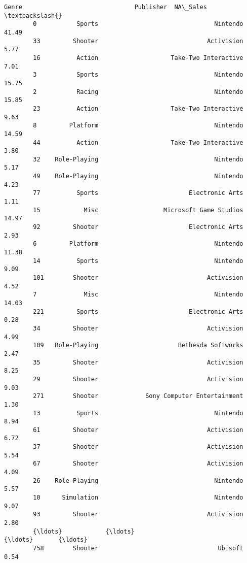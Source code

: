 \documentclass[11pt]{article}
\begin{document}
\begin{Verbatim}[commandchars=\\\{\}]
                     Genre                               Publisher  NA\_Sales  \textbackslash{}
        0           Sports                                Nintendo     41.49   
        33         Shooter                              Activision      5.77   
        16          Action                    Take-Two Interactive      7.01   
        3           Sports                                Nintendo     15.75   
        2           Racing                                Nintendo     15.85   
        23          Action                    Take-Two Interactive      9.63   
        8         Platform                                Nintendo     14.59   
        44          Action                    Take-Two Interactive      3.80   
        32    Role-Playing                                Nintendo      5.17   
        49    Role-Playing                                Nintendo      4.23   
        77          Sports                         Electronic Arts      1.11   
        15            Misc                  Microsoft Game Studios     14.97   
        92         Shooter                         Electronic Arts      2.93   
        6         Platform                                Nintendo     11.38   
        14          Sports                                Nintendo      9.09   
        101        Shooter                              Activision      4.52   
        7             Misc                                Nintendo     14.03   
        221         Sports                         Electronic Arts      0.28   
        34         Shooter                              Activision      4.99   
        109   Role-Playing                      Bethesda Softworks      2.47   
        35         Shooter                              Activision      8.25   
        29         Shooter                              Activision      9.03   
        271        Shooter             Sony Computer Entertainment      1.30   
        13          Sports                                Nintendo      8.94   
        61         Shooter                              Activision      6.72   
        37         Shooter                              Activision      5.54   
        67         Shooter                              Activision      4.09   
        26    Role-Playing                                Nintendo      5.57   
        10      Simulation                                Nintendo      9.07   
        93         Shooter                              Activision      2.80   
        {\ldots}            {\ldots}                                     {\ldots}       {\ldots}   
        758        Shooter                                 Ubisoft      0.54   

\end{Verbatim}
\end{document}
